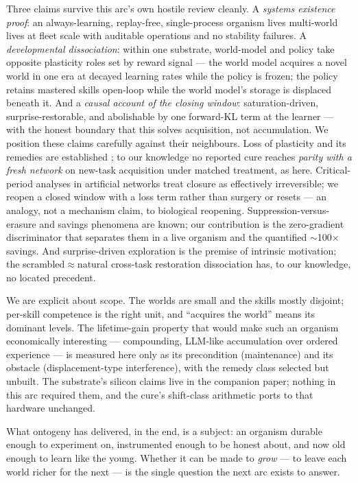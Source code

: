 \documentclass[sn-nature]{sn-jnl}
\begin{document}
Three claims survive this arc's own hostile review cleanly. A
\emph{systems existence proof}: an always-learning, replay-free,
single-process organism lives multi-world lives at fleet scale with
auditable operations and no stability failures. A \emph{developmental
dissociation}: within one substrate, world-model and policy take opposite
plasticity roles set by reward signal --- the world model acquires a novel
world in one era at decayed learning rates while the policy is frozen; the
policy retains mastered skills open-loop while the world model's storage is
displaced beneath it. And a \emph{causal account of the closing window}:
saturation-driven, surprise-restorable, and abolishable by one forward-KL
term at the learner --- with the honest boundary that this solves
acquisition, not accumulation. We position these claims carefully against
their neighbours. Loss of plasticity and its remedies are established
\cite{dohare2024,sokar2023,nikishin2023,juliani2024}; to our knowledge no
reported cure reaches \emph{parity with a fresh network} on new-task
acquisition under matched treatment, as here. Critical-period analyses in
artificial networks treat closure as effectively
irreversible\cite{achille2019}; we reopen a closed window with a loss
term rather than surgery or resets --- an analogy, not a mechanism claim,
to biological reopening\cite{pizzorusso2002}. Suppression-versus-erasure
and savings phenomena are known\cite{davari2022,hetherington1989}; our
contribution is the zero-gradient discriminator that separates them in a
live organism and the quantified $\sim$100$\times$ savings. And
surprise-driven exploration is the premise of intrinsic
motivation\cite{burda2019}; the scrambled$\approx$natural cross-task
restoration dissociation has, to our knowledge, no located precedent.

We are explicit about scope. The worlds are small and the skills mostly
disjoint; per-skill competence is the right unit, and ``acquires the world''
means its dominant levels. The lifetime-gain property that would make such
an organism economically interesting --- compounding, LLM-like accumulation
over ordered experience --- is measured here only as its precondition
(maintenance) and its obstacle (displacement-type interference), with the
remedy class selected but unbuilt. The substrate's silicon claims live in
the companion paper; nothing in this arc required them, and the cure's
shift-class arithmetic ports to that hardware unchanged.

What ontogeny has delivered, in the end, is a subject: an organism durable
enough to experiment on, instrumented enough to be honest about, and now
old enough to learn like the young. Whether it can be made to \emph{grow}
--- to leave each world richer for the next --- is the single question the
next arc exists to answer.
\end{document}
